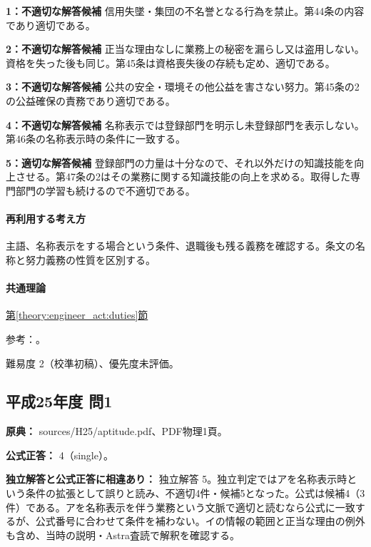 \noindent\textbf{1：不適切な解答候補} 信用失墜・集団の不名誉となる行為を禁止。第44条の内容であり適切である。\par

\noindent\textbf{2：不適切な解答候補} 正当な理由なしに業務上の秘密を漏らし又は盗用しない。資格を失った後も同じ。第45条は資格喪失後の存続も定め、適切である。\par

\noindent\textbf{3：不適切な解答候補} 公共の安全・環境その他公益を害さない努力。第45条の2の公益確保の責務であり適切である。\par

\noindent\textbf{4：不適切な解答候補} 名称表示では登録部門を明示し未登録部門を表示しない。第46条の名称表示時の条件に一致する。\par

\noindent\textbf{5：適切な解答候補} 登録部門の力量は十分なので、それ以外だけの知識技能を向上させる。第47条の2はその業務に関する知識技能の向上を求める。取得した専門部門の学習も続けるので不適切である。\par

\paragraph{再利用する考え方} 主語、名称表示をする場合という条件、退職後も残る義務を確認する。条文の名称と努力義務の性質を区別する。

\paragraph{共通理論} \hyperref[theory:engineer_act:duties]{第\ref*{theory:engineer_act:duties}節}

\par 参考：\cite{engineer_act_current}。

\par 難易度 2（校準初稿）、優先度未評価。

\subsection{平成25年度 問1}
\label{q:h25-reg-apt-01}

\noindent\textbf{原典：} sources/H25/aptitude.pdf、PDF物理1頁。

\textbf{公式正答：} 4（single）。

\par\textbf{独立解答と公式正答に相違あり：} 独立解答 5。独立判定ではアを名称表示時という条件の拡張として誤りと読み、不適切4件・候補5となった。公式は候補4（3件）である。アを名称表示を伴う業務という文脈で適切と読むなら公式に一致するが、公式番号に合わせて条件を補わない。イの情報の範囲と正当な理由の例外も含め、当時の説明・Astra査読で解釈を確認する。

